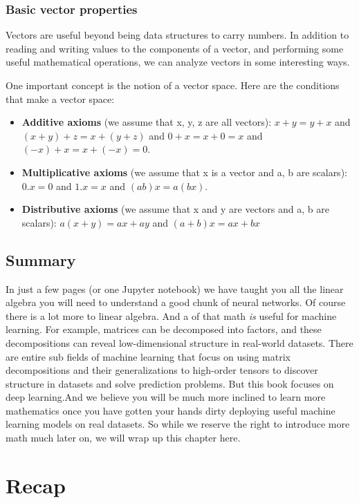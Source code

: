 \documentclass[]{article}
\begin{document}
\subsubsection{Basic vector properties}

Vectors are useful beyond being data structures to carry numbers. In addition to reading and writing values to the components of a vector, and performing some useful mathematical operations, we can analyze vectors in some interesting ways.

One important concept is the notion of a vector space. Here are the conditions that make a vector space:

\begin{itemize}
	\item \textbf{Additive axioms} (we assume that x, y, z are all vectors): $ x+y=y+x $ and $ (x + y) + z = x + (y+z) $ and $ 0 +x=x+ 0 =x $ and $ (-x) + x = x + (-x) =0 $.
	\item \textbf{Multiplicative axioms} (we assume that x is a vector and a, b are scalars): $ 0.x= 0 $ and $ 1.x=x $ and $ (ab)x=a(bx) $.
	\item \textbf{Distributive axioms} (we assume that x and y are vectors and a, b are scalars): $ a(x+y) = ax+ay $ and $ (a+b)x = ax + bx $
\end{itemize}

\subsection{Summary}

In just a few pages (or one Jupyter notebook) we have taught you all the linear algebra you will need to understand a good chunk of neural networks. Of course there is a lot more to linear algebra. And a  of that math \textit{is} useful for machine learning. For example, matrices can be decomposed into factors, and these decompositions can reveal low-dimensional structure in real-world datasets. There are entire sub fields of machine learning that focus on using matrix decompositions and their generalizations to high-order tensors to discover structure in datasets and solve prediction problems. But this book focuses on deep learning.And we believe you will be much more inclined to learn more mathematics once you have gotten your hands dirty deploying useful machine learning models on real datasets. So while we reserve the right to introduce more math much later on, we will wrap up this chapter here.

\section{Recap}


\nocite{*}

\printbibliography
\end{document}
